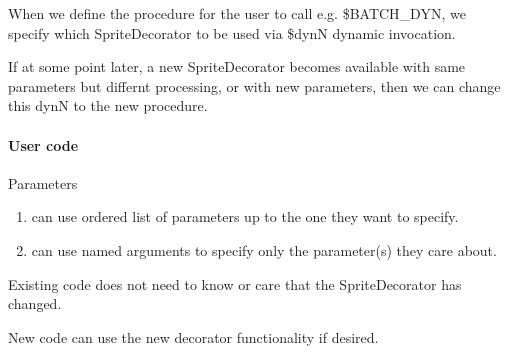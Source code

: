 \documentclass[letterpaper,10pt,english]{sphinxmanual}
\begin{document}
When we define the procedure for the user to call e.g. \$BATCH\_DYN, we specify which SpriteDecorator to be used via \$dynN dynamic invocation.

If at some point later, a new SpriteDecorator becomes available with same parameters but differnt processing, or with new parameters, then we can change this dynN to the new procedure.


\paragraph{User code}
\label{\detokenize{Stdlib/StandardisingStdLib:user-code}}
Parameters
\begin{enumerate}
%
\item {} 
can use ordered list of parameters up to the one they want to specify.

\item {} 
can use named arguments to specify only the parameter(s) they care about.

\end{enumerate}

Existing code does not need to know or care that the SpriteDecorator has changed.

New code can use the new decorator functionality if desired.
\end{document}
